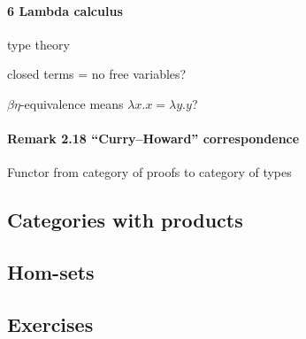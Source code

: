 \documentclass[12pt, letterpaper]{article}
\newcommand{\red}[1]{{\color{red} #1}}
\theoremstyle{definition}
\theoremstyle{remark}
\theoremstyle{definition}
\theoremstyle{plain}
\numberwithin{equation}{section}
\begin{document}
	\paragraph{6 Lambda calculus}
	
	\red{type theory}
	
	\red{closed terms = no free variables?}
	
	\red{$\beta\eta$-equivalence means $\lambda x.x=\lambda y.y$?}
	\paragraph{Remark 2.18 ``Curry--Howard'' correspondence}
	
	\red{Functor from category of proofs to category of types}
	
	\subsection{Categories with products}
	
	
	
	\subsection{Hom-sets}
	\subsection{Exercises}
\end{document}
